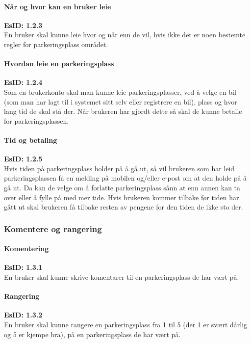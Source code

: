 \documentclass[12pt]{article}
\begin{document}
            \paragraph{Når og hvor kan en bruker leie}
            \textbf{EsID: 1.2.3}\\En bruker skal kunne leie hvor og når enn de vil, hvis ikke det er noen bestemte regler for parkeringsplass området.

            \paragraph{Hvordan leie en parkeringsplass}
            \textbf{EsID: 1.2.4}\\Som en brukerkonto skal man kunne leie parkeringsplasser, ved å velge en bil (som man har lagt til i systemet sitt selv eller registrere en bil), plass og hvor lang tid de skal stå der. Når brukeren har gjordt dette så skal de kunne betalle for parkeringsplassen.

            \paragraph{Tid og betaling}
            \textbf{EsID: 1.2.5}\\Hvis tiden på parkeringsplass holder på å gå ut, så vil brukeren som har leid parkeringsplassen få en melding på mobilen og/eller e-post om at den holde på å gå ut. Da kan de velge om å forlatte parkeringsplass sånn at enn annen kan ta over eller å fylle på med mer tide. Hvis brukeren kommer tilbake før tiden har gått ut skal brukeren få tilbake resten av pengene for den tiden de ikke sto der.

        \subsubsection{Komentere og rangering}

            \paragraph{Komentering}
            \textbf{EsID: 1.3.1}\\En bruker skal kunne skrive komentarer til en parkeringsplass de har vært på. 

            \paragraph{Rangering}
            \textbf{EsID: 1.3.2}\\En bruker skal kunne rangere en parkeringsplass fra 1 til 5 (der 1 er svært dårlig og 5 er kjempe bra), på en parkeringsplass de har vært på.
\end{document}

